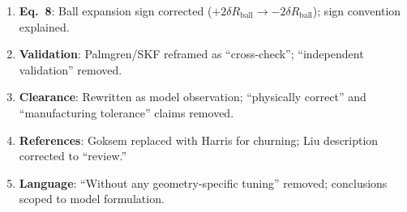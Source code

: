 \documentclass[11pt]{article}
\begin{document}
\begin{enumerate}[nosep]
    \item \textbf{Eq.~8}: Ball expansion sign corrected ($+2\delta R_\text{ball} \to -2\delta R_\text{ball}$); sign convention explained.
    \item \textbf{Validation}: Palmgren/SKF reframed as ``cross-check''; ``independent validation'' removed.
    \item \textbf{Clearance}: Rewritten as model observation; ``physically correct'' and ``manufacturing tolerance'' claims removed.
    \item \textbf{References}: Goksem replaced with Harris for churning; Liu description corrected to ``review.''
    \item \textbf{Language}: ``Without any geometry-specific tuning'' removed; conclusions scoped to model formulation.
\end{enumerate}
\end{document}
